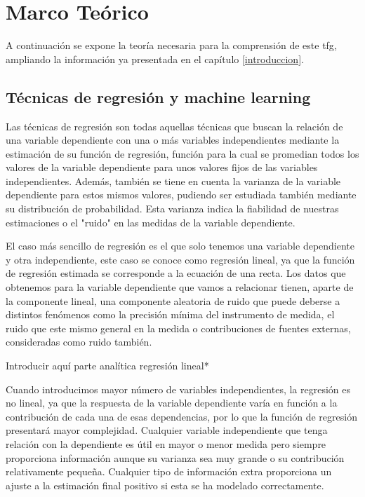
\chapter{Marco Teórico}
\label{marcoteorico}
\par A continuación se expone la teoría necesaria para la comprensión de este \gls{tfg}, ampliando la información ya presentada en el capítulo \ref{introduccion}.
\section{Técnicas de regresión y machine learning}
\par Las técnicas de regresión son todas aquellas técnicas que buscan la relación de una variable dependiente con una o más variables independientes mediante la estimación de su función de regresión, función para la cual se promedian todos los valores de la variable dependiente para unos valores fijos de las variables independientes. Además, también se tiene en cuenta la varianza de la variable dependiente para estos mismos valores, pudiendo ser estudiada también mediante su distribución de probabilidad. Esta varianza indica la fiabilidad de nuestras estimaciones o el "ruido" en las medidas de la variable dependiente. 
\\
\par El caso más sencillo de regresión es el que solo tenemos una variable dependiente y otra independiente, este caso se conoce como regresión lineal, ya que la función de regresión estimada se corresponde a la ecuación de una recta. Los datos que obtenemos para la variable dependiente que vamos a relacionar tienen, aparte de la componente lineal, una componente aleatoria de ruido que puede deberse a distintos fenómenos como la precisión mínima del instrumento de medida, el ruido que este mismo general en la medida o contribuciones de fuentes externas, consideradas como ruido también. 
\\
\par *Introducir aquí parte analítica regresión lineal*
\\ 
\par Cuando introducimos mayor número de variables independientes, la regresión es no lineal, ya que la respuesta de la variable dependiente varía en función a la contribución de cada una de esas dependencias, por lo que la función de regresión presentará mayor complejidad. Cualquier variable independiente que tenga relación con la dependiente es útil en mayor o menor medida pero siempre proporciona información aunque su varianza sea muy grande o su contribución relativamente pequeña. Cualquier tipo de información extra proporciona un ajuste a la estimación final positivo si esta se ha modelado correctamente. 
